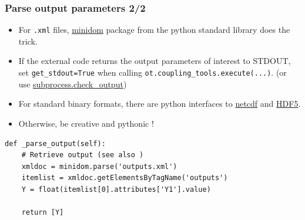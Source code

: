 \documentclass[10pt, aspectratio=169]{beamer}
\begin{document}
\begin{frame}[fragile]
\frametitle{Parse output parameters 2/2}
\begin{itemize}
\item For \texttt{.xml} files, \href{https://docs.python.org/2/library/xml.dom.minidom.html}{minidom} package from the python standard library does the trick.
\item If the external code returns the output parameters of
  interest to STDOUT, set \texttt{get\_stdout=True} when calling
  \texttt{ot.coupling\_tools.execute(...)}.  (or use \href{https://docs.python.org/2/library/subprocess.html#subprocess.check_output}{subprocess.check\_output})
\item For standard binary formats, there are python interfaces to \href{https://github.com/Unidata/netcdf4-python}{netcdf}
  and \href{http://www.h5py.org/}{HDF5}.
\item Otherwise, be creative and pythonic !
\end{itemize}
\begin{Verbatim}[xleftmargin=10mm]
def _parse_output(self):
    # Retrieve output (see also )
    xmldoc = minidom.parse('outputs.xml')
    itemlist = xmldoc.getElementsByTagName('outputs')
    Y = float(itemlist[0].attributes['Y1'].value)

    return [Y]
\end{Verbatim}
\end{frame}
\end{document}
